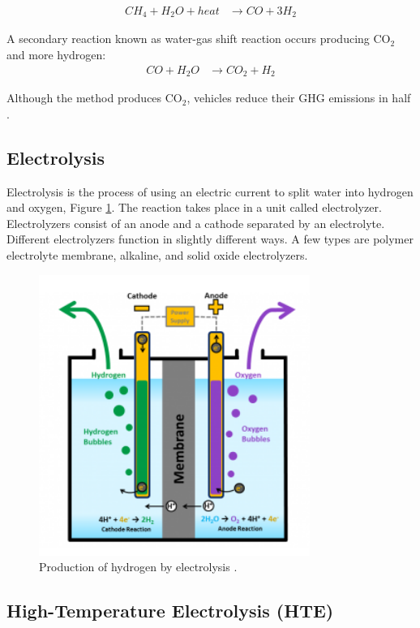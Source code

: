 \documentclass{anstrans}
\begin{document}
\begin{align}
CH_4 + H_2O + heat & \rightarrow CO + 3H_2
\label{eq:1}
\end{align}

A secondary reaction known as water-gas shift reaction occurs producing CO$_2$ and more hydrogen:
\begin{align}
CO + H_2O & \rightarrow CO_2 + H_2
\label{eq:2}
\end{align}

Although the method produces CO$_2$, vehicles reduce their GHG emissions in half \cite{noauthor_hydrogen_nodate}.

\subsection{Electrolysis}

Electrolysis is the process of using an electric current to split water into hydrogen and oxygen, Figure \ref{fig:electro}. The reaction takes place in a unit called electrolyzer. Electrolyzers consist of an anode and a cathode separated by an electrolyte. Different electrolyzers function in slightly different ways. A few types are polymer electrolyte membrane, alkaline, and solid oxide electrolyzers.

\begin{figure}[]
	\centering
	\includegraphics[width=0.55\linewidth]{figures/electrolysis.png}
	\hfill
	\caption{Production of hydrogen by electrolysis \cite{noauthor_hydrogen_nodate}.}
	\label{fig:electro}
\end{figure}

\subsection{High-Temperature Electrolysis (HTE)}
\end{document}
